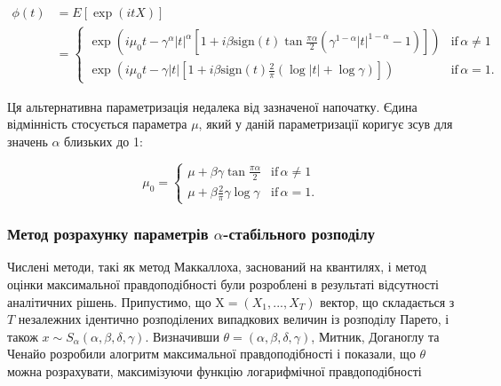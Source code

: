 \documentclass[
  letterpaper,
]{report}
\begin{document}
\[
    \begin{split}
    \phi(t) &= E\left[\exp(itX)\right] \\
            &= 
        \begin{cases} 
            \exp\left(i \mu_{0} t - \gamma^{\alpha}|t|^{\alpha} \left[1+i\beta\text{sign}(t)\tan{\frac{\pi\alpha}{2}}\left( \gamma^{1-\alpha}|t|^{1-\alpha}-1 \right)\right]\right) & \text{if} \, \alpha \neq 1 \\ \exp\left(i \mu_{0} t - \gamma|t| \left[1+i\beta\text{sign}(t)\frac{2}{\pi}\left(\log{|t|} + \log{\gamma}\right) \right]\right) & \text{if} \, \alpha = 1. 
        \end{cases}
    \end{split} 
\]

Ця альтернативна параметризація недалека від зазначеної напочатку. Єдина
відмінність стосується параметра \(\mu\), який у даній параметризації
коригує зсув для значень \(\alpha\) близьких до 1:

\[ 
\mu_{0} = \begin{cases} \mu + \beta\gamma\tan{\frac{\pi\alpha}{2}} & \text{if} \, \alpha \neq 1 \\ \mu + \beta\frac{2}{\pi}\gamma\log{\gamma} & \text{if} \, \alpha = 1. \end{cases} 
\]

\hypertarget{ux43cux435ux442ux43eux434-ux440ux43eux437ux440ux430ux445ux443ux43dux43aux443-ux43fux430ux440ux430ux43cux435ux442ux440ux456ux432-alpha-ux441ux442ux430ux431ux456ux43bux44cux43dux43eux433ux43e-ux440ux43eux437ux43fux43eux434ux456ux43bux443}{%
\subsubsection{\texorpdfstring{Метод розрахунку параметрів
\(\alpha\)-стабільного
розподілу}{Метод розрахунку параметрів \textbackslash alpha-стабільного розподілу}}\label{ux43cux435ux442ux43eux434-ux440ux43eux437ux440ux430ux445ux443ux43dux43aux443-ux43fux430ux440ux430ux43cux435ux442ux440ux456ux432-alpha-ux441ux442ux430ux431ux456ux43bux44cux43dux43eux433ux43e-ux440ux43eux437ux43fux43eux434ux456ux43bux443}}

Числені методи, такі як метод Маккаллоха, заснований на квантилях, і
метод оцінки максимальної правдоподібності були розроблені в результаті
відсутності аналітичних рішень. Припустимо, що
\(\text{X} = (X_1, ... , X_T)\) вектор, що складається з \(T\)
незалежних ідентично розподілених випадкових величин із розподілу
Парето, і також \(x \sim S_{\alpha}(\alpha, \beta, \delta, \gamma)\).
Визначивши \(\theta = (\alpha, \beta, \delta, \gamma)\), Митник,
Доганоглу та Ченайо розробили алогритм максимальної правдоподібності і
показали, що \(\theta\) можна розрахувати, максимізуючи функцію
логарифмічної правдоподібності
\end{document}
